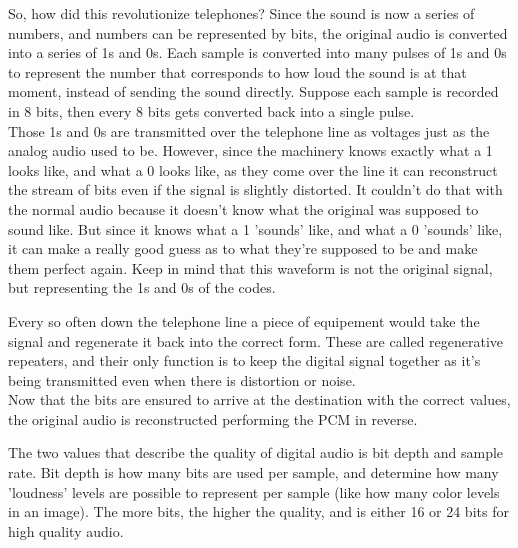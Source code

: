 \begin{center}\end{center}
\begin{center}\end{center}

So, how did this revolutionize telephones? Since the sound is now a series of numbers, and numbers can be represented by bits, the original audio is converted into a series of 1s and 0s. Each sample is converted into many pulses of 1s and 0s to represent the number that corresponds to how loud the sound is at that moment, instead of sending the sound directly. Suppose each sample is recorded in 8 bits, then every 8 bits gets converted back into a single pulse.\\

Those 1s and 0s are transmitted over the telephone line as voltages just as the analog audio used to be. However, since the machinery knows exactly what a 1 looks like, and what a 0 looks like, as they come over the line it can reconstruct the stream of bits even if the signal is slightly distorted. It couldn't do that with the normal audio because it doesn't know what the original was supposed to sound like. But since it knows what a 1 'sounds' like, and what a 0 'sounds' like, it can make a really good guess as to what they're supposed to be and make them perfect again. Keep in mind that this waveform is not the original signal, but representing the 1s and 0s of the codes.\\

\begin{center}\end{center}

Every so often down the telephone line a piece of equipement would take the signal and regenerate it back into the correct form. These are called regenerative repeaters, and their only function is to keep the digital signal together as it's being transmitted even when there is distortion or noise.\\

Now that the bits are ensured to arrive at the destination with the correct values, the original audio is reconstructed performing the PCM in reverse.

\begin{center}\end{center}

The two values that describe the quality of digital audio is bit depth and sample rate. Bit depth is how many bits are used per sample, and determine how many 'loudness' levels are possible to represent per sample (like how many color levels in an image). The more bits, the higher the quality, and is either 16 or 24 bits for high quality audio.\\

